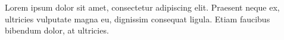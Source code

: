 \documentclass{ltjarticle}
\begin{document}
Lorem ipsum dolor sit amet, consectetur adipiscing elit. Praesent neque ex, ultricies vulputate magna eu, dignissim consequat ligula. Etiam faucibus bibendum dolor, at ultricies. 


\printbibliography
\end{document}
